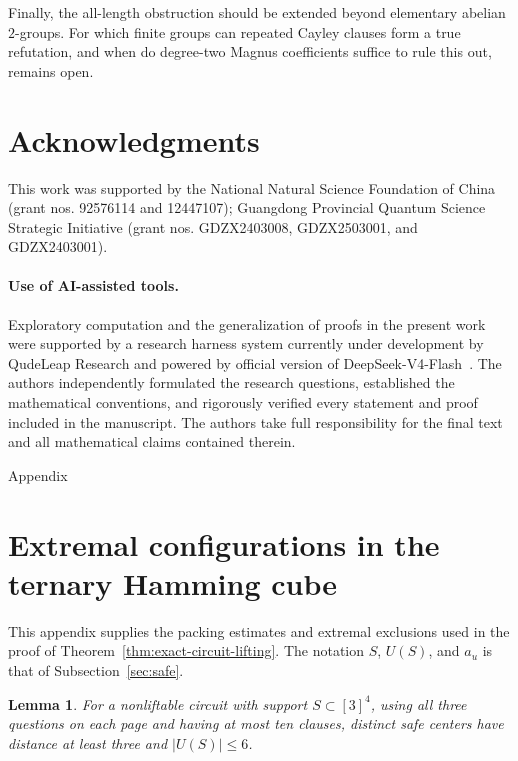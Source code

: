 \documentclass[11pt]{article}
\newtheorem{lemma}[theorem]{Lemma}
\theoremstyle{definition}
\theoremstyle{remark}
\newcommand{\card}[1]{\lvert #1\rvert}
\numberwithin{equation}{section}
\begin{document}
Finally, the all-length obstruction should be extended beyond elementary
abelian \(2\)-groups.  For which finite groups can repeated Cayley clauses form
a true refutation, and when do degree-two Magnus coefficients suffice to rule
this out, remains open.

\section*{Acknowledgments}
This work was supported by the National Natural Science Foundation of China
(grant nos. 92576114 and 12447107); Guangdong Provincial Quantum Science
Strategic Initiative (grant nos. GDZX2403008, GDZX2503001, and GDZX2403001).

\paragraph{Use of AI-assisted tools.}
Exploratory computation and the generalization of proofs in the present work were supported by a research harness system currently under development by QudeLeap Research and powered by official version of DeepSeek-V4-Flash~\cite{deepseek2026deepseekv4}. The authors independently formulated the research questions, established the mathematical conventions, and rigorously verified every statement and proof included in the manuscript. The authors take full responsibility for the final text and all mathematical claims contained therein.




\appendix

\begin{center}
\Large{Appendix}
\end{center}

\section{Extremal configurations in the ternary Hamming cube}
\label{app:extremal-hamming}

This appendix supplies the packing estimates and extremal exclusions used
in the proof of Theorem~\ref{thm:exact-circuit-lifting}.  The notation
\(S\), \(U(S)\), and \(a_u\) is that of Subsection~\ref{sec:safe}.

\begin{lemma}\label{lem:separation-packing}
For a nonliftable circuit with support \(S\subset[3]^4\), using all three
questions on each page and having at most ten clauses,
distinct safe centers have distance at least three and
\(\card{U(S)}\leq6\).
\end{lemma}
\end{document}
